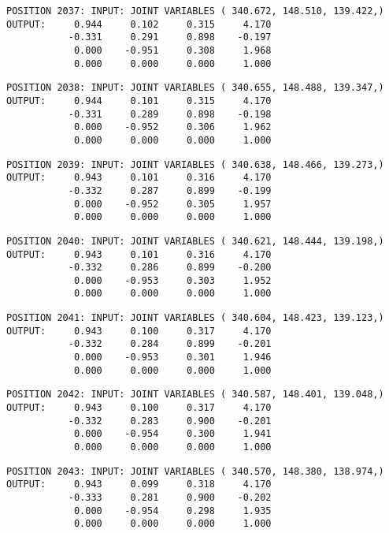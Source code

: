 \begin{verbatim}
POSITION 2037: INPUT: JOINT VARIABLES ( 340.672, 148.510, 139.422,)
OUTPUT:     0.944     0.102     0.315     4.170
           -0.331     0.291     0.898    -0.197
            0.000    -0.951     0.308     1.968
            0.000     0.000     0.000     1.000
\end{verbatim} \pagebreak[1]\begin{verbatim}
POSITION 2038: INPUT: JOINT VARIABLES ( 340.655, 148.488, 139.347,)
OUTPUT:     0.944     0.101     0.315     4.170
           -0.331     0.289     0.898    -0.198
            0.000    -0.952     0.306     1.962
            0.000     0.000     0.000     1.000
\end{verbatim} \pagebreak[1]\begin{verbatim}
POSITION 2039: INPUT: JOINT VARIABLES ( 340.638, 148.466, 139.273,)
OUTPUT:     0.943     0.101     0.316     4.170
           -0.332     0.287     0.899    -0.199
            0.000    -0.952     0.305     1.957
            0.000     0.000     0.000     1.000
\end{verbatim} \pagebreak[1]\begin{verbatim}
POSITION 2040: INPUT: JOINT VARIABLES ( 340.621, 148.444, 139.198,)
OUTPUT:     0.943     0.101     0.316     4.170
           -0.332     0.286     0.899    -0.200
            0.000    -0.953     0.303     1.952
            0.000     0.000     0.000     1.000
\end{verbatim} \pagebreak[1]\begin{verbatim}
POSITION 2041: INPUT: JOINT VARIABLES ( 340.604, 148.423, 139.123,)
OUTPUT:     0.943     0.100     0.317     4.170
           -0.332     0.284     0.899    -0.201
            0.000    -0.953     0.301     1.946
            0.000     0.000     0.000     1.000
\end{verbatim} \pagebreak[1]\begin{verbatim}
POSITION 2042: INPUT: JOINT VARIABLES ( 340.587, 148.401, 139.048,)
OUTPUT:     0.943     0.100     0.317     4.170
           -0.332     0.283     0.900    -0.201
            0.000    -0.954     0.300     1.941
            0.000     0.000     0.000     1.000
\end{verbatim} \pagebreak[1]\begin{verbatim}
POSITION 2043: INPUT: JOINT VARIABLES ( 340.570, 148.380, 138.974,)
OUTPUT:     0.943     0.099     0.318     4.170
           -0.333     0.281     0.900    -0.202
            0.000    -0.954     0.298     1.935
            0.000     0.000     0.000     1.000
\end{verbatim} \pagebreak[1]\begin{verbatim}

\end{verbatim}
